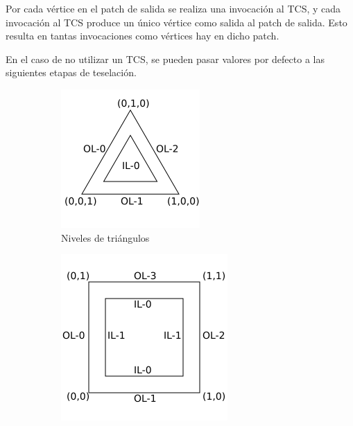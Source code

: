 Por cada vértice en el patch de salida se realiza una invocación al TCS, y cada
invocación al TCS produce un único vértice como salida al patch de salida. Esto
resulta en tantas invocaciones como vértices hay en dicho patch.

En el caso de no utilizar un TCS, se pueden pasar valores por defecto a las
siguientes etapas de teselación.

\begin{figure}[t]
	\centering
	\begin{subfigure}{.45\textwidth}
		\includegraphics[width=\textwidth]{figures/TriangleLevels.png}	
		\caption{Niveles de triángulos}
		\label{fig:trilevels}
	\end{subfigure}
	\hfill
	\begin{subfigure}{.45\textwidth}
		\includegraphics[width=\textwidth]{figures/QuadLevels.png}	

\end{subfigure}
\end{figure}
